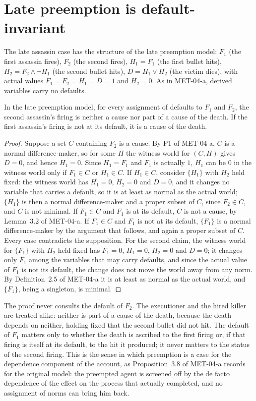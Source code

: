 \documentclass{situationist-preprint}
\begin{document}
\section{Late preemption is default-invariant}

The late assassin case has the structure of the late preemption model: $F_1$ (the first assassin fires), $F_2$ (the second fires), $H_1 = F_1$ (the first bullet hits), $H_2 = F_2 \wedge \neg H_1$ (the second bullet hits), $D = H_1 \vee H_2$ (the victim dies), with actual values $F_1 = F_2 = H_1 = D = 1$ and $H_2 = 0$. As in MET-04-a, derived variables carry no defaults.

\begin{proposition}\label{p:invariant}
In the late preemption model, for every assignment of defaults to $F_1$ and $F_2$, the second assassin's firing is neither a cause nor part of a cause of the death. If the first assassin's firing is not at its default, it is a cause of the death.
\end{proposition}

\begin{proof}
Suppose a set $C$ containing $F_2$ is a cause. By P1 of MET-04-a, $C$ is a normal difference-maker, so for some $H$ the witness world for $(C, H)$ gives $D = 0$, and hence $H_1 = 0$. Since $H_1 = F_1$ and $F_1$ is actually $1$, $H_1$ can be $0$ in the witness world only if $F_1 \in C$ or $H_1 \in C$. If $H_1 \in C$, consider $\{H_1\}$ with $H_2$ held fixed: the witness world has $H_1 = 0$, $H_2 = 0$ and $D = 0$, and it changes no variable that carries a default, so it is at least as normal as the actual world; $\{H_1\}$ is then a normal difference-maker and a proper subset of $C$, since $F_2 \in C$, and $C$ is not minimal. If $F_1 \in C$ and $F_1$ is at its default, $C$ is not a cause, by Lemma~3.2 of MET-04-a. If $F_1 \in C$ and $F_1$ is not at its default, $\{F_1\}$ is a normal difference-maker by the argument that follows, and again a proper subset of $C$. Every case contradicts the supposition. For the second claim, the witness world for $\{F_1\}$ with $H_2$ held fixed has $F_1 = 0$, $H_1 = 0$, $H_2 = 0$ and $D = 0$; it changes only $F_1$ among the variables that may carry defaults, and since the actual value of $F_1$ is not its default, the change does not move the world away from any norm. By Definition~2.5 of MET-04-a it is at least as normal as the actual world, and $\{F_1\}$, being a singleton, is minimal.
\end{proof}

The proof never consults the default of $F_2$. The executioner and the hired killer are treated alike: neither is part of a cause of the death, because the death depends on neither, holding fixed that the second bullet did not hit. The default of $F_1$ matters only to whether the death is ascribed to the first firing or, if that firing is itself at its default, to the hit it produced; it never matters to the status of the second firing. This is the sense in which preemption is a case for the dependence component of the account, as Proposition~3.8 of MET-04-a records for the original model: the preempted agent is screened off by the de facto dependence of the effect on the process that actually completed, and no assignment of norms can bring him back.
\end{document}
